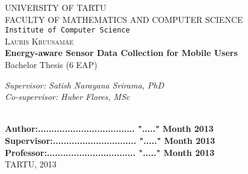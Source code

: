 \begin{titlepage}

\begin{center}



\textsc{UNIVERSITY OF TARTU}\\

\textsc{FACULTY OF MATHEMATICS AND COMPUTER SCIENCE}\\

\texttt{Institute of Computer Science}\\[5cm]

\textsc{ \large Lauris Kruusamäe}\\[0.5cm]
{\Huge \bfseries Energy-aware Sensor Data Collection for Mobile Users}\\[0.5cm]
{\large Bachelor Thesis (6 EAP)}\\[3cm]



\begin{minipage}{0.8\textwidth}
\begin{flushright} \large
\emph{Supervisor: Satish Narayana Srirama, PhD}  \\	  %
\emph{Co-supervisor: Huber Flores, MSc}  %
\end{flushright}
\end{minipage}

\textbf{}\\[1.0cm]

\textbf{Author:.................................... "....." Month   2013}\\[0.5cm]

\textbf{Supervisor:............................... "....." Month   2013}\\[0.5cm]

\textbf{Professor:................................. "....." Month   2013}\\[0.5cm]        

\vfill
{\large TARTU, 2013}

\end{center}

\end{titlepage}
